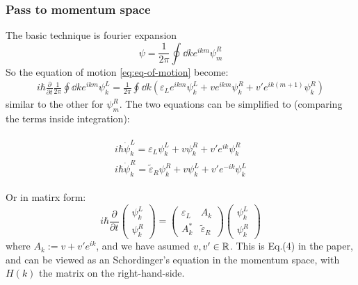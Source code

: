 \documentclass{article}
\begin{document}
\subsubsection{Pass to momentum space}
\label{sec:Pass-to-momentum-space}

The basic technique is fourier expansion
\begin{equation}
    \psi = \frac{1}{2\pi} \oint \dd{k} e^{ikm}\psi^R_m
\end{equation}
So the equation of motion \ref{eq:eq-of-motion} become:
\begin{align*}
    i\hbar \frac{\partial }{\partial t}\frac{1}{2\pi}
    \oint \dd{k} e^{ikm} \psi^L_k 
    =\frac{1}{2\pi} \oint \dd{k}  
    \left( \varepsilon_L e^{ikm}\psi^L_k
    + v e^{ikm}\psi^R_k + v' e^{ik(m+1)}\psi^R_k \right)
\end{align*}
similar to the other for $\psi^R_m$.  
The two equations can be simplified to (comparing the terms inside
integration):

\begin{align}
    \label{eq:eq-of-motion-in-k}
    \begin{aligned}
    i\hbar \dot{\psi}^L_k = \varepsilon_L\psi^L_k + v\psi^R_k
    +v' e^{ik} \psi^R_k \\
    i\hbar \dot{\psi}^R_k = \tilde{\varepsilon}_R\psi^R_k + v\psi^L_k
    +v'e^{-ik}\psi^L_{k}
    \end{aligned}
\end{align}

Or in matirx form:
\begin{equation}
    \label{eq:eq-of-motion-in-k-mat}
    i\hbar \frac{\partial }{\partial t}
        \begin{pmatrix}
            \psi^L_k \\ \psi^R_k
        \end{pmatrix}
        =
        \begin{pmatrix}
            \varepsilon_L & A_k \\
            A_k^* & \tilde\varepsilon_R
        \end{pmatrix}
        \begin{pmatrix}
            \psi^L_k \\ \psi^R_k
        \end{pmatrix}
\end{equation}
where $A_k:=v+v'e^{ik}$, and we have asumed $v,v'\in\mathbb{R}$. This is
Eq.(4) in the paper, and can be viewed as an Schordinger's equation in
the momentum space, with $H(k)$ the matrix on the right-hand-side.
\end{document}
